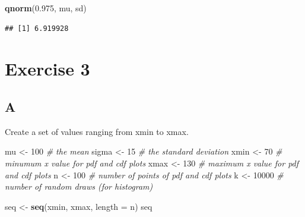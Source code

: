\documentclass[
]{article}
\newenvironment{Shaded}{\begin{snugshade}}{\end{snugshade}}
\newcommand{\CommentTok}[1]{\textcolor[rgb]{0.56,0.35,0.01}{\textit{#1}}}
\newcommand{\DataTypeTok}[1]{\textcolor[rgb]{0.13,0.29,0.53}{#1}}
\newcommand{\DecValTok}[1]{\textcolor[rgb]{0.00,0.00,0.81}{#1}}
\newcommand{\FloatTok}[1]{\textcolor[rgb]{0.00,0.00,0.81}{#1}}
\newcommand{\KeywordTok}[1]{\textcolor[rgb]{0.13,0.29,0.53}{\textbf{#1}}}
\newcommand{\NormalTok}[1]{#1}
\newcommand{\StringTok}[1]{\textcolor[rgb]{0.31,0.60,0.02}{#1}}
\begin{document}
\begin{Shaded}
\begin{Highlighting}[]
\KeywordTok{qnorm}\NormalTok{(}\FloatTok{0.975}\NormalTok{, mu, sd)}
\end{Highlighting}
\end{Shaded}

\begin{verbatim}
## [1] 6.919928
\end{verbatim}

\hypertarget{exercise-3}{%
\section{Exercise 3}\label{exercise-3}}

\hypertarget{a-2}{%
\subsection{A}\label{a-2}}

Create a set of values ranging from xmin to xmax.

\begin{Shaded}
\begin{Highlighting}[]
\NormalTok{mu \textless{}{-}}\StringTok{ }\DecValTok{100} \CommentTok{\# the mean}
\NormalTok{sigma \textless{}{-}}\StringTok{ }\DecValTok{15} \CommentTok{\# the standard deviation}
\NormalTok{xmin \textless{}{-}}\StringTok{ }\DecValTok{70} \CommentTok{\# minumum x value for pdf and cdf plots}
\NormalTok{xmax \textless{}{-}}\StringTok{ }\DecValTok{130} \CommentTok{\# maximum x value for pdf and cdf plots}
\NormalTok{n \textless{}{-}}\StringTok{ }\DecValTok{100} \CommentTok{\# number of points of pdf and cdf plots}
\NormalTok{k \textless{}{-}}\StringTok{ }\DecValTok{10000} \CommentTok{\# number of random draws (for histogram)}

\NormalTok{seq \textless{}{-}}\StringTok{ }\KeywordTok{seq}\NormalTok{(xmin, xmax, }\DataTypeTok{length =}\NormalTok{ n)}
\NormalTok{seq}
\end{Highlighting}
\end{Shaded}
\end{document}
